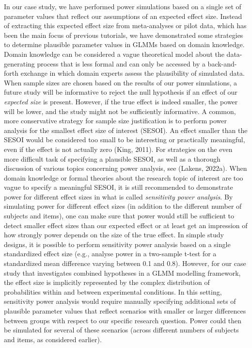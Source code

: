 \documentclass[
  man,floatsintext]{apa6}
\begin{document}
In our case study, we have performed power simulations based on a single set of parameter values that reflect our assumptions of an expected effect size. Instead of extracting this expected effect size from meta-analyses or pilot data, which has been the main focus of previous tutorials, we have demonstrated some strategies to determine plausible parameter values in GLMMs based on domain knowledge. Domain knowledge can be considered a vague theoretical model about the data-generating process that is less formal and can only be accessed by a back-and-forth exchange in which domain experts assess the plausibility of simulated data. When sample sizes are chosen based on the results of our power simulations, a future study will be informative to reject the null hypothesis if an effect of our \emph{expected size} is present. However, if the true effect is indeed smaller, the power will be lower, and the study might not be sufficiently informative. A common, more conservative strategy for sample size justification is to perform power analysis for the smallest effect size of interest (SESOI). An effect smaller than the SESOI would be considered too small to be interesting or practically meaningful, even if the effect is not actually zero (King, 2011). For strategies on the even more difficult task of specifying a plausible SESOI, as well as a thorough discussion of various topics concerning power analysis, see (Lakens, 2022a). When domain knowledge or formal theories about the research topic of interest are too vague to specify a meaningful SESOI, it is still recommended to demonstrate power for different effect sizes in what is called \emph{sensitivity power analysis}. By simulating power for different effect sizes (in addition to the different number of subjects and items), one can make sure that power would still be sufficient to detect smaller effect sizes than our expected effect or at least get an impression of how strongly power depends on the size of the true effect. In simple study designs, it is possible to perform sensitivity power analysis based on a single standardized effect size (e.g., analyse power in a two-sample t-test for a standardized mean difference varying between 0.1 and 0.8). However, for our case study that investigates combined hypotheses in a GLMM modelling framework, the effect size is implicitly represented by the complex distribution of probabilities within and between experimental conditions. In this setting, sensitivity power analysis would require manually specifying additional sets of plausible parameter values that reflect scenarios with smaller or larger differences between groups with respect to our specific research question. Power could then be simulated for several of these scenarios (across different numbers of subjects and items, as considered earlier).
\end{document}
